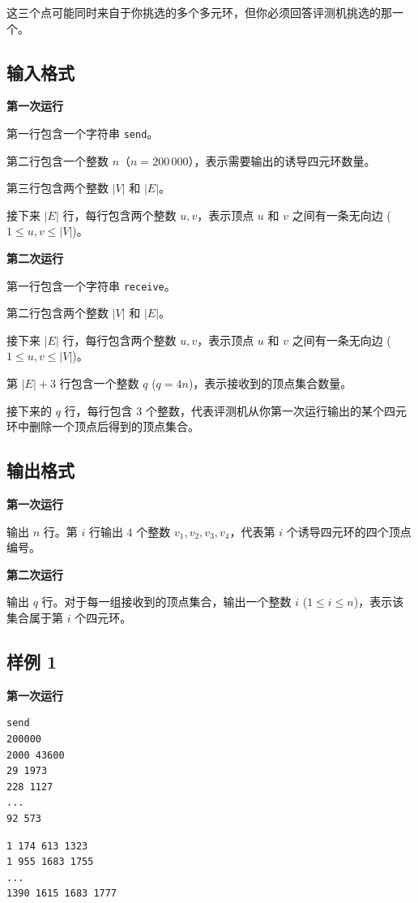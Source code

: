 这三个点可能同时来自于你挑选的多个多元环，但你必须回答评测机挑选的那一个。

\subsection{输入格式}

\textbf{第一次运行}

第一行包含一个字符串 \texttt{send}。

第二行包含一个整数 $n$（$n = 200\,000$），表示需要输出的诱导四元环数量。

第三行包含两个整数 $|V|$ 和 $|E|$。

接下来 $|E|$ 行，每行包含两个整数 $u, v$，表示顶点 $u$ 和 $v$ 之间有一条无向边 ($1 \le u, v \le |V|$)。

\textbf{第二次运行}

第一行包含一个字符串 \texttt{receive}。

第二行包含两个整数 $|V|$ 和 $|E|$。

接下来 $|E|$ 行，每行包含两个整数 $u, v$，表示顶点 $u$ 和 $v$ 之间有一条无向边 ($1 \le u, v \le |V|$)。

第 $|E| + 3$ 行包含一个整数 $q$ ($q = 4n$)，表示接收到的顶点集合数量。

接下来的 $q$ 行，每行包含 $3$ 个整数，代表评测机从你第一次运行输出的某个四元环中删除一个顶点后得到的顶点集合。

\subsection{输出格式}

\textbf{第一次运行}

输出 $n$ 行。第 $i$ 行输出 $4$ 个整数 $v_1, v_2, v_3, v_4$，代表第 $i$ 个诱导四元环的四个顶点编号。

\textbf{第二次运行}

输出 $q$ 行。对于每一组接收到的顶点集合，输出一个整数 $i$ ($1 \le i \le n$)，表示该集合属于第 $i$ 个四元环。

\subsection{样例 1}

\textbf{第一次运行}

\begin{minipage}{\linewidth}
	\begin{minipage}[t]{0.49\linewidth}
		\begin{lstlisting}[title=\texttt{standard input}]
send
200000
2000 43600
29 1973
228 1127
...
92 573
\end{lstlisting}
	\end{minipage}
	\begin{minipage}[t]{0.49\linewidth}
		\begin{lstlisting}[title=\texttt{standard output}]
1 174 613 1323
1 955 1683 1755
...
1390 1615 1683 1777
\end{lstlisting}
	\end{minipage}
\end{minipage}

